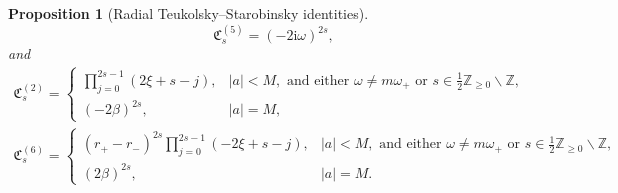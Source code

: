 \documentclass[11pt]{article}
\newtheorem{proposition}{Proposition}[section]
\newcommand{\ii}{\mathrm{i}}
\numberwithin{equation}{section}
\begin{document}
\begin{proposition}[Radial Teukolsky--Starobinsky identities]
\begin{equation*}
        \qquad
        \mathfrak C^{(5)}_s=(-2\ii\omega)^{2s},
\end{equation*}
 and
\begin{equation}\label{eq:C2-C6}
\begin{gathered}
\mathfrak C^{(2)}_s=
\begin{cases}
\displaystyle \prod_{j=0}^{2s-1}(2\xi+s-j), & |a|<M, \text{~and either $\omega\neq m\omega_+$ or $s\in\frac12\mathbb Z_{\geq 0}\backslash\mathbb Z$},\\[2mm]
(-2\beta)^{2s}, & |a|=M,
\end{cases}
\\
\mathfrak C^{(6)}_s=
\begin{cases}
\displaystyle (r_+-r_-)^{2s}\prod_{j=0}^{2s-1}(-2\xi+s-j), & |a|<M, \text{~and either $\omega\neq m\omega_+$ or $s\in\frac12\mathbb Z_{\geq 0}\backslash\mathbb Z$},\\[2mm]
(2\beta)^{2s}, & |a|=M.
\end{cases}
\end{gathered}
\end{equation}
\end{proposition}
\end{document}
